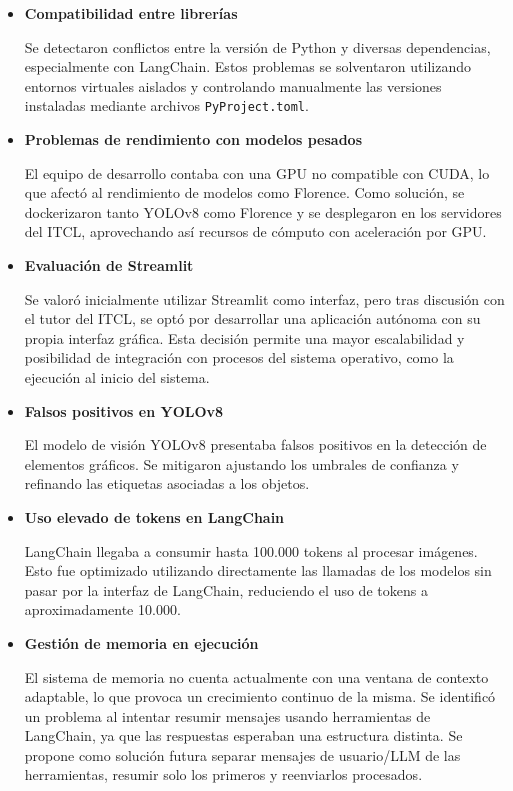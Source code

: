\begin{itemize}
    \item \textbf{Compatibilidad entre librerías} 
    
    Se detectaron conflictos entre la versión de Python y diversas dependencias, especialmente con LangChain. Estos problemas se solventaron utilizando entornos virtuales aislados y controlando manualmente las versiones instaladas mediante archivos \texttt{PyProject.toml}.

    \item \textbf{Problemas de rendimiento con modelos pesados}
    
    El equipo de desarrollo contaba con una GPU no compatible con CUDA, lo que afectó al rendimiento de modelos como Florence. Como solución, se dockerizaron tanto YOLOv8 como Florence y se desplegaron en los servidores del ITCL, aprovechando así recursos de cómputo con aceleración por GPU.

    \item \textbf{Evaluación de Streamlit} 
    
    Se valoró inicialmente utilizar Streamlit como interfaz, pero tras discusión con el tutor del ITCL, se optó por desarrollar una aplicación autónoma con su propia interfaz gráfica. Esta decisión permite una mayor escalabilidad y posibilidad de integración con procesos del sistema operativo, como la ejecución al inicio del sistema.

    \item \textbf{Falsos positivos en YOLOv8} 
    
    El modelo de visión YOLOv8 presentaba falsos positivos en la detección de elementos gráficos. Se mitigaron ajustando los umbrales de confianza y refinando las etiquetas asociadas a los objetos.

    \item \textbf{Uso elevado de tokens en LangChain} 
    
    LangChain llegaba a consumir hasta 100.000 tokens al procesar imágenes. Esto fue optimizado utilizando directamente las llamadas de los modelos sin pasar por la interfaz de LangChain, reduciendo el uso de tokens a aproximadamente 10.000.

    \item \textbf{Gestión de memoria en ejecución} 
    
    El sistema de memoria no cuenta actualmente con una ventana de contexto adaptable, lo que provoca un crecimiento continuo de la misma. Se identificó un problema al intentar resumir mensajes usando herramientas de LangChain, ya que las respuestas esperaban una estructura distinta. Se propone como solución futura separar mensajes de usuario/LLM de las herramientas, resumir solo los primeros y reenviarlos procesados.


\end{itemize}
